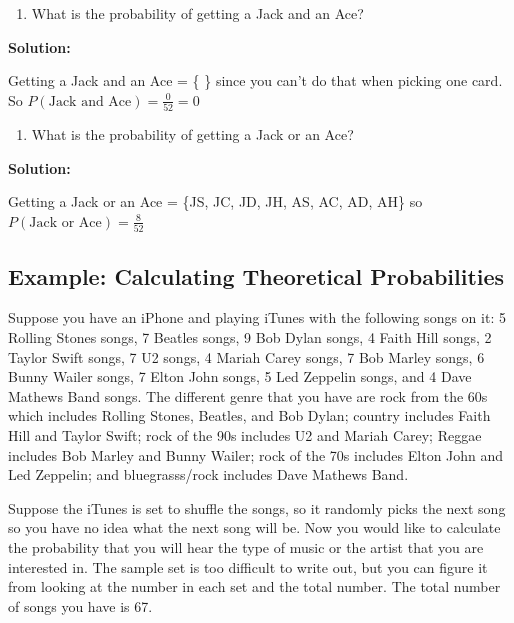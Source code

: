 \documentclass[]{book}
\providecommand{\tightlist}{%
  \setlength{\itemsep}{0pt}\setlength{\parskip}{0pt}}
\begin{document}
\begin{enumerate}
\def\labelenumi{\alph{enumi}.}
\setcounter{enumi}{7}
\tightlist
\item
  What is the probability of getting a Jack and an Ace?
\end{enumerate}

\textbf{Solution:}

Getting a Jack and an Ace = \{ \} since you can't do that when picking one card. So \(P(\text{Jack and Ace})=\frac{0}{52}=0\)

\begin{enumerate}
\def\labelenumi{\roman{enumi}.}
\tightlist
\item
  What is the probability of getting a Jack or an Ace?
\end{enumerate}

\textbf{Solution:}

Getting a Jack or an Ace = \{JS, JC, JD, JH, AS, AC, AD, AH\} so \(P(\text{Jack or Ace})=\frac{8}{52}\)

\hypertarget{example-calculating-theoretical-probabilities-2}{%
\subsection{Example: Calculating Theoretical Probabilities}\label{example-calculating-theoretical-probabilities-2}}

Suppose you have an iPhone and playing iTunes with the following songs on it: 5 Rolling Stones songs, 7 Beatles songs, 9 Bob Dylan songs, 4 Faith Hill songs, 2 Taylor Swift songs, 7 U2 songs, 4 Mariah Carey songs, 7 Bob Marley songs, 6 Bunny Wailer songs, 7 Elton John songs, 5 Led Zeppelin songs, and 4 Dave Mathews Band songs. The different genre that you have are rock from the 60s which includes Rolling Stones, Beatles, and Bob Dylan; country includes Faith Hill and Taylor Swift; rock of the 90s includes U2 and Mariah Carey; Reggae includes Bob Marley and Bunny Wailer; rock of the 70s includes Elton John and Led Zeppelin; and bluegrasss/rock includes Dave Mathews Band.

Suppose the iTunes is set to shuffle the songs, so it randomly picks the next song so you have no idea what the next song will be. Now you would like to calculate the probability that you will hear the type of music or the artist that you are interested in. The sample set is too difficult to write out, but you can figure it from looking at the number in each set and the total number. The total number of songs you have is 67.
\end{document}

